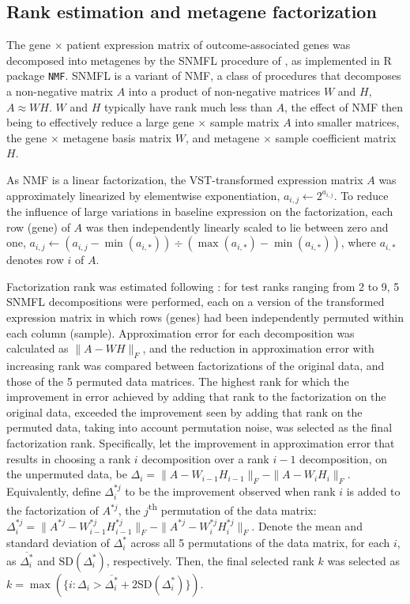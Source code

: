 \documentclass[dissertation.tex]{subfiles}
\begin{document}
\subsection{Rank estimation and metagene factorization}
\label{subsec:sigs-nmf}
The gene $\times$ patient expression matrix of outcome-associated genes was decomposed into metagenes by the \gls{SNMFL} procedure of \cite{Kim2007}, as implemented in R package \texttt{NMF}.  \gls{SNMFL} is a variant of \gls{NMF}, a class of procedures that decomposes a non-negative matrix $A$ into a product of non-negative matrices $W$ and $H$, $A \approx WH$.  $W$ and $H$ typically have rank much less than $A$, the effect of \gls{NMF} then being to effectively reduce a large gene $\times$ sample matrix $A$ into smaller matrices, the gene $\times$ metagene basis matrix $W$, and metagene $\times$ sample coefficient matrix $H$.

As \gls{NMF} is a linear factorization, the \gls{VST}-transformed expression matrix $A$ was approximately linearized by elementwise exponentiation, $a_{i,j} \leftarrow 2^{a_{i,j}}$.  To reduce the influence of large variations in baseline expression on the factorization, each row (gene) of $A$ was then independently linearly scaled to lie between zero and one, $a_{i,j} \leftarrow (a_{i,j} - \min(a_{i,*})) \div (\max(a_{i,*}) - \min(a_{i,*}))$, where $a_{i,*}$ denotes row $i$ of $A$.

Factorization rank was estimated following \cite{Frigyesi2008}: for test ranks ranging from 2 to 9, 5 \gls{SNMFL} decompositions were performed, each on a version of the transformed expression matrix in which rows (genes) had been independently permuted within each column (sample).  Approximation error for each decomposition was calculated as $\|A - W H\|_F$, and the reduction in approximation error with increasing rank was compared between factorizations of the original data, and those of the 5 permuted data matrices.  The highest rank for which the improvement in error achieved by adding that rank to the factorization on the original data, exceeded the improvement seen by adding that rank on the permuted data, taking into account permutation noise, was selected as the final factorization rank.  Specifically, let the improvement in approximation error that results in choosing a rank $i$ decomposition over a rank $i-1$ decomposition, on the unpermuted data, be $\Delta_i = \|A - W_{i-1} H_{i-1}\|_F - \|A - W_{i} H_{i}\|_F$.  Equivalently, define $\Delta^{*j}_i$ to be the improvement observed when rank $i$ is added to the factorization of $A^{*j}$, the $j$\textsuperscript{th} permutation of the data matrix: $\Delta^{*j}_i = \|A^{*j} - W^{*j}_{i-1} H^{*j}_{i-1}\|_F - \|A^{*j} - W^{*j}_{i} H^{*j}_{i}\|_F$.  Denote the mean and standard deviation of $\Delta^{*}_i$ across all 5 permutations of the data matrix, for each $i$, as $\overline{\Delta^{*}_i}$ and $\text{SD}(\Delta^{*}_i)$, respectively.  Then, the final selected rank $k$ was selected as $k = \max(\{i : \Delta_i > \overline{\Delta^{*}_i} + 2 \text{SD}(\Delta^{*}_i)\})$.
\end{document}

